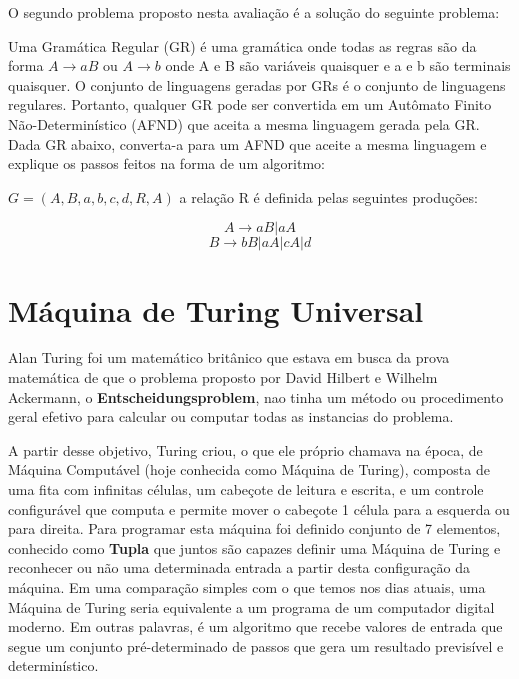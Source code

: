 \documentclass[
	article,			%
	11pt,				%
	oneside,			%
	a4paper,			%
	english,			%
	brazil,				%
	sumario=tradicional
	]{abntex2}
\begin{document}
    O segundo problema proposto nesta avaliação é a solução do seguinte problema:
    
    Uma Gramática Regular (GR) é uma gramática onde todas as regras são da forma $A → aB$ ou $A → b$ onde A e B são variáveis quaisquer e a e b são terminais quaisquer. O conjunto de linguagens geradas por GRs é o conjunto de linguagens regulares. Portanto, qualquer GR pode ser convertida em um Autômato Finito Não-Determinístico (AFND) que aceita a  mesma linguagem gerada pela GR. Dada GR abaixo, converta-a para um AFND que aceite a mesma linguagem e explique os passos feitos na forma de um algoritmo:
    
    $G = ({A,B}, {a,b,c,d}, R, A)$ a relação R é definida pelas seguintes produções:
    
                             \[A \longrightarrow aB | aA\] 
                            \[B \longrightarrow bB | aA | cA | d\]
                            
    

\section{Máquina de Turing Universal}

    Alan Turing foi um matemático britânico que estava em busca da prova matemática de que o problema proposto por David Hilbert e Wilhelm Ackermann, o \textbf{Entscheidungsproblem}, nao tinha um método ou procedimento geral efetivo para calcular ou computar todas as instancias do problema.

    
    A partir desse objetivo, Turing criou, o que ele próprio chamava na época, de Máquina Computável (hoje conhecida como Máquina de Turing), composta de uma fita com infinitas células, um cabeçote de leitura e escrita, e um controle configurável que computa e permite mover o cabeçote 1 célula para a esquerda ou para direita. Para programar esta máquina foi definido conjunto de 7 elementos, conhecido como \textbf{Tupla} que juntos são capazes definir uma Máquina de Turing e reconhecer ou não uma determinada entrada a partir desta configuração da máquina. Em uma comparação simples com o que temos nos dias atuais, uma Máquina de Turing seria equivalente a um programa de um computador digital moderno. Em outras palavras, é um algoritmo que recebe valores de entrada que segue um conjunto pré-determinado de passos que gera um resultado previsível e determinístico. 
    
\end{document}
